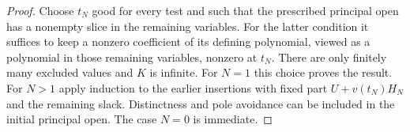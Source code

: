 \begin{proof}
Choose $t_N$ good for every test and such that the prescribed principal
open has a nonempty slice in the remaining variables. For the latter
condition it suffices to keep a nonzero coefficient of its defining
polynomial, viewed as a polynomial in those remaining variables,
nonzero at $t_N$. There are only finitely many excluded values and $K$
is infinite. For $N=1$ this choice proves the result. For $N>1$ apply
induction to the earlier insertions with fixed part $U+v(t_N)H_N$ and
the remaining slack. Distinctness and pole
avoidance can be included in the initial principal open. The case $N=0$
is immediate.
\end{proof}
